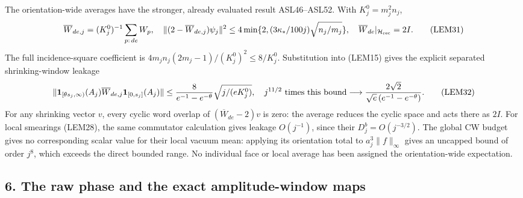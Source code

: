 \documentclass[11pt]{article}
\begin{document}
The orientation-wide averages have the stronger, already evaluated result ASL46–ASL52. With \(K_j^0=m_j^2n_j\),
\[
 \overline W_{de,j}=(K_j^0)^{-1}\sum_{p:\,de}W_p,\quad
 \|(2-\overline W_{de,j})\psi_j\|^2
 \le4\min\{2,(3\kappa_*/100j)\sqrt{n_j/m_j}\},\quad
 \overline W_{de}|_{\mathcal H_{\rm rec}}=2I.
 \tag{LEM31}
\]
The full incidence-square coefficient is \(4m_jn_j(2m_j-1)/(K_j^0)^2\le8/K_j^0\). Substitution into (LEM15) gives the explicit separated shrinking-window leakage
\[
 \|\mathbf1_{[\theta s_j,\infty)}(A_j)\overline W_{de,j}
        \mathbf1_{[0,s_j]}(A_j)\|
 \le {8\over e^{-1}-e^{-\theta}}\sqrt{j/(eK_j^0)},\quad
 j^{11/2}\text{ times this bound}\longrightarrow
 {2\sqrt2\over\sqrt e\,(e^{-1}-e^{-\theta})}.
 \tag{LEM32}
\]
For any shrinking vector \(v\), every cyclic word overlap of \((\overline W_{de}-2)v\) is zero: the average reduces the cyclic space and acts there as \(2I\). For local smearings (LEM28), the same commutator calculation gives leakage \(O(j^{-1})\), since their \(D_j^b=O(j^{-3/2})\). The global CW budget gives no corresponding scalar value for their local vacuum mean: applying its orientation total to \(a_j^3\|f\|_\infty\) gives an uncapped bound of order \(j^8\), which exceeds the direct bounded range. No individual face or local average has been assigned the orientation-wide expectation.

\subsection*{6. The raw phase and the exact amplitude-window maps}
\end{document}
